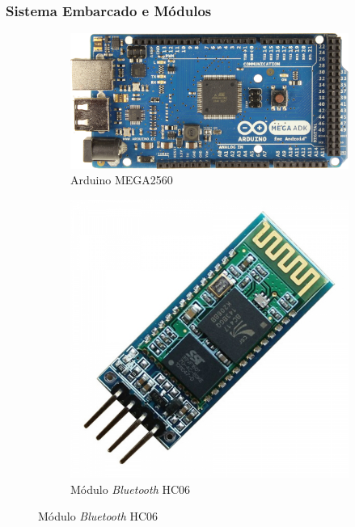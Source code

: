 \documentclass[hyperref={pdfpagelabels=false}]{beamer}
\begin{document}
                \begin{frame}\frametitle{Sistema Embarcado e Módulos}

                    \begin{figure}[H]
                        \centering
                        \begin{subfigure}[b]{.45\textwidth}
                            \centering
                            \includegraphics[scale=0.05]{Imagens/Zi05.jpg}
                        	\caption[Arduino MEGA2560]{Arduino MEGA2560}
                        	\label{fig:x002}
                        \end{subfigure} %
                        \begin{subfigure}[b]{.45\textwidth}
                            \centering
                        	\includegraphics[scale=0.10]{Imagens/Zi06.jpg}
                        	\caption[Módulo \textit{Bluetooth} HC06]{Módulo \textit{Bluetooth} HC06}
                        	\label{fig:backview}
                        \end{subfigure}


\end{figure}
\end{frame}
\end{document}
